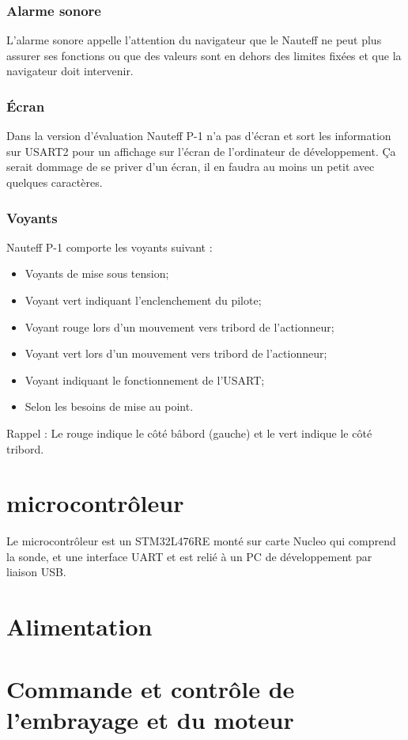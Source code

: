\documentclass[a4paper,11pt]{report}
\begin{document}
\subsubsection{Alarme sonore}
L'alarme sonore appelle l'attention du navigateur que le Nauteff ne peut plus
assurer ses fonctions ou que des valeurs sont en dehors des limites fixées
et que la navigateur doit intervenir.

\subsubsection{Écran}
Dans la version d'évaluation Nauteff P-1 n'a pas d'écran et sort les information
sur USART2 pour un affichage sur l'écran de l'ordinateur de développement.
Ça serait dommage de se priver d'un écran, il en faudra au moins un petit avec quelques caractères.

\subsubsection{Voyants}
Nauteff P-1 comporte les voyants suivant :
\begin{itemize}
	\item Voyants de mise sous tension;
	\item Voyant vert indiquant l'enclenchement du pilote;
	\item Voyant rouge lors d'un mouvement vers tribord de l'actionneur;
	\item Voyant vert lors d'un mouvement vers tribord de l'actionneur;
	\item Voyant indiquant le fonctionnement de l'USART;
	\item Selon les besoins de mise au point.
\end{itemize}
Rappel : Le rouge indique le côté bâbord (gauche) et le vert indique le côté tribord.

\section{microcontrôleur}
Le microcontrôleur est un STM32L476RE monté sur carte Nucleo
qui comprend la sonde, et une interface UART et est relié
à un PC de développement par liaison USB.

\section{Alimentation}

\section{Commande et contrôle de l'embrayage et du moteur}
\end{document}
